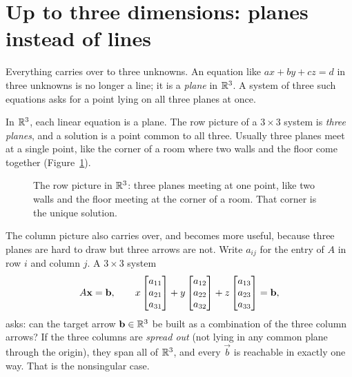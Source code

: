 \section{Up to three dimensions: planes instead of lines}

Everything carries over to three unknowns. An equation like $a x + b y + c z = d$ in three unknowns is
no longer a line; it is a \emph{plane} in $\mathbb{R}^3$. A system of three such
equations asks for a point lying on all three planes at once.

\begin{intuitionbox}
In $\mathbb{R}^3$, each linear equation is a plane. The row picture of a
$3\times3$ system is \emph{three planes}, and a solution is a point common to
all three. Usually three planes meet at a single point, like the corner of
a room where two walls and the floor come together
(Figure~\ref{ch06:corner}).
\end{intuitionbox}

\begin{figure}[H]
\centering
{}
\caption{The row picture in $\mathbb{R}^3$: three planes meeting at one point, like
two walls and the floor meeting at the corner of a room. That corner is the
unique solution.}
\label{ch06:corner}
\end{figure}

The column picture also carries over, and becomes more useful, because
three planes are hard to draw but three arrows are not. Write $a_{ij}$ for
the entry of $A$ in row $i$ and column $j$. A $3\times3$ system
\[
  A\mathbf{x}=\mathbf{b},\qquad
  x\begin{bmatrix}a_{11}\\a_{21}\\a_{31}\end{bmatrix} + y\begin{bmatrix}a_{12}\\a_{22}\\a_{32}\end{bmatrix}
  + z\begin{bmatrix}a_{13}\\a_{23}\\a_{33}\end{bmatrix} = \mathbf{b},
\]
asks: can the target arrow $\mathbf{b}\in\mathbb{R}^3$ be built as a combination of the
three column arrows? If the three columns are \emph{spread out} (not lying
in any common plane through the origin), they span all of $\mathbb{R}^3$, and every $\vec b$ is
reachable in exactly one way. That is the nonsingular case.

